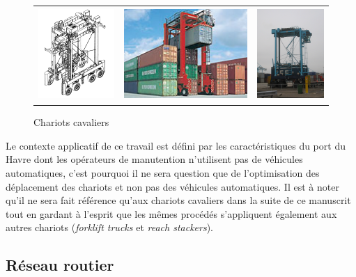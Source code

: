 \begin{figure}[ht]
 \label{fig:sc}
 \begin{center}
  \begin{tabular}{ccc}
	  \includegraphics[height=3.5cm]{chapitres/application/schema_sc.jpg} & \includegraphics[height=3.5cm]{chapitres/application/tn-straddle-carriers.jpg} & \includegraphics[height=3.5cm]{chapitres/application/containerlift_straddle_carrier.jpg}
  \end{tabular}
 \end{center}
  \caption{Chariots cavaliers}
\end{figure}

Le contexte applicatif de ce travail est défini par les caractéristiques du port du Havre dont les opérateurs de manutention n'utilisent pas de véhicules automatiques, c'est pourquoi il ne sera question que de l'optimisation des déplacement des chariots et non pas des véhicules automatiques. Il est à noter qu'il ne sera fait référence qu'aux chariots cavaliers dans la suite de ce manuscrit tout en gardant à l'esprit que les mêmes procédés s'appliquent également aux autres chariots (\textit{forklift trucks} et \textit{reach stackers}).

\subsection{Réseau routier}

